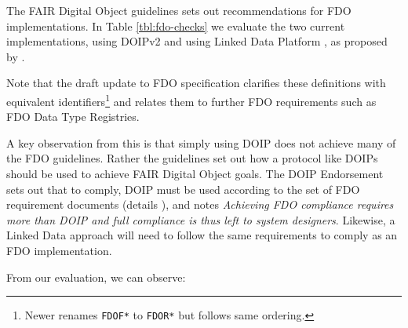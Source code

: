 \documentclass[fleqn,10pt,NOlineno]{wlpeerjlua}
\begin{document}
The FAIR Digital Object guidelines \autocite{boninoFAIRDigitalObject} sets out recommendations for FDO implementations. In Table \vref{tbl:fdo-checks} we evaluate the two current implementations, using DOIPv2 \autocite{foundationDigitalObjectInterface} and using Linked Data Platform \autocite{w3-ldp}, as proposed by \autocite{FDOFramework}.

Note that the draft update to FDO specification \autocite{fdo-RequirementSpec} clarifies these definitions with equivalent identifiers\footnote{Newer \autocite{fdo-RequirementSpec} renames \texttt{FDOF*} to \texttt{FDOR*} but follows same ordering.} and relates them to further FDO requirements such as FDO Data Type Registries.

A key observation from this is that simply using DOIP does not achieve many of the FDO guidelines. Rather the guidelines set out how a protocol like DOIPs should be used to achieve FAIR Digital Object goals. The DOIP Endorsement \autocite{fdo-DOIPEndorsement} sets out that to comply, DOIP must be used according to the set of FDO requirement documents (details ), and notes \emph{Achieving FDO compliance requires more than DOIP and full compliance is thus left to system designers}. Likewise, a Linked Data approach will need to follow the same requirements to comply as an FDO implementation.



From our evaluation, we can observe:
\end{document}

